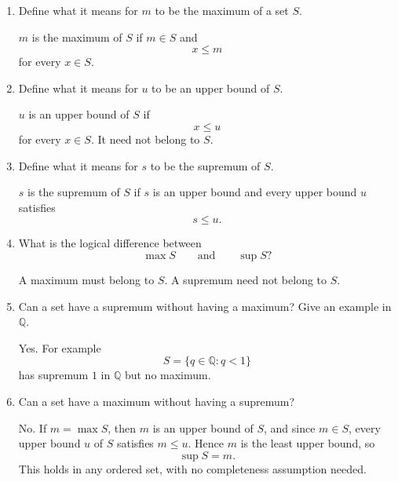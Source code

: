 \documentclass{self-check}
\begin{document}
\begin{enumerate}[label=\arabic*., itemsep=10pt]

\item Define what it means for $m$ to be the maximum of a set $S$.

\begin{answer}
$m$ is the maximum of $S$ if $m\in S$ and
\[
x\le m
\]
for every $x\in S$.
\end{answer}

\item Define what it means for $u$ to be an upper bound of $S$.

\begin{answer}
$u$ is an upper bound of $S$ if
\[
x\le u
\]
for every $x\in S$. It need not belong to $S$.
\end{answer}

\item Define what it means for $s$ to be the supremum of $S$.

\begin{answer}
$s$ is the supremum of $S$ if $s$ is an upper bound and every upper bound $u$ satisfies
\[
s\le u.
\]
\end{answer}

\item What is the logical difference between
\[
\max S
\qquad\text{and}\qquad
\sup S?
\]

\begin{answer}
A maximum must belong to $S$. A supremum need not belong to $S$.
\end{answer}

\item Can a set have a supremum without having a maximum? Give an example in $\mathbb{Q}$.

\begin{answer}
Yes. For example
\[
S=\{q\in\mathbb{Q}:q<1\}
\]
has supremum $1$ in $\mathbb{Q}$ but no maximum.
\end{answer}

\item Can a set have a maximum without having a supremum?

\begin{answer}
No. If $m=\max S$, then $m$ is an upper bound of $S$, and since $m\in S$, every upper bound $u$ of $S$ satisfies $m\le u$. Hence $m$ is the least upper bound, so
\[
\sup S=m.
\]
This holds in any ordered set, with no completeness assumption needed.
\end{answer}


\end{enumerate}
\end{document}
